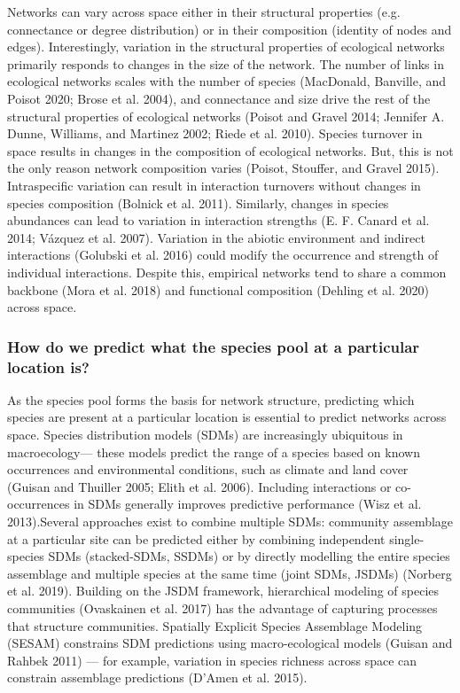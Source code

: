 \documentclass[10pt,oneside]{article}
\begin{document}
Networks can vary across space either in their structural properties
(e.g. connectance or degree distribution) or in their composition
(identity of nodes and edges). Interestingly, variation in the
structural properties of ecological networks primarily responds to
changes in the size of the network. The number of links in ecological
networks scales with the number of species (MacDonald, Banville, and
Poisot 2020; Brose et al. 2004), and connectance and size drive the rest
of the structural properties of ecological networks (Poisot and Gravel
2014; Jennifer A. Dunne, Williams, and Martinez 2002; Riede et al.
2010). Species turnover in space results in changes in the composition
of ecological networks. But, this is not the only reason network
composition varies (Poisot, Stouffer, and Gravel 2015). Intraspecific
variation can result in interaction turnovers without changes in species
composition (Bolnick et al. 2011). Similarly, changes in species
abundances can lead to variation in interaction strengths (E. F. Canard
et al. 2014; Vázquez et al. 2007). Variation in the abiotic environment
and indirect interactions (Golubski et al. 2016) could modify the
occurrence and strength of individual interactions. Despite this,
empirical networks tend to share a common backbone (Mora et al. 2018)
and functional composition (Dehling et al. 2020) across space.

\hypertarget{how-do-we-predict-what-the-species-pool-at-a-particular-location-is}{%
\subsubsection{How do we predict what the species pool at a particular
location
is?}\label{how-do-we-predict-what-the-species-pool-at-a-particular-location-is}}

As the species pool forms the basis for network structure, predicting
which species are present at a particular location is essential to
predict networks across space. Species distribution models (SDMs) are
increasingly ubiquitous in macroecology--- these models predict the
range of a species based on known occurrences and environmental
conditions, such as climate and land cover (Guisan and Thuiller 2005;
Elith et al. 2006). Including interactions or co-occurrences in SDMs
generally improves predictive performance (Wisz et al. 2013).Several
approaches exist to combine multiple SDMs: community assemblage at a
particular site can be predicted either by combining independent
single-species SDMs (stacked-SDMs, SSDMs) or by directly modelling the
entire species assemblage and multiple species at the same time (joint
SDMs, JSDMs) (Norberg et al. 2019). Building on the JSDM framework,
hierarchical modeling of species communities (Ovaskainen et al. 2017)
has the advantage of capturing processes that structure communities.
Spatially Explicit Species Assemblage Modeling (SESAM) constrains SDM
predictions using macro-ecological models (Guisan and Rahbek 2011) ---
for example, variation in species richness across space can constrain
assemblage predictions (D'Amen et al. 2015).
\end{document}
